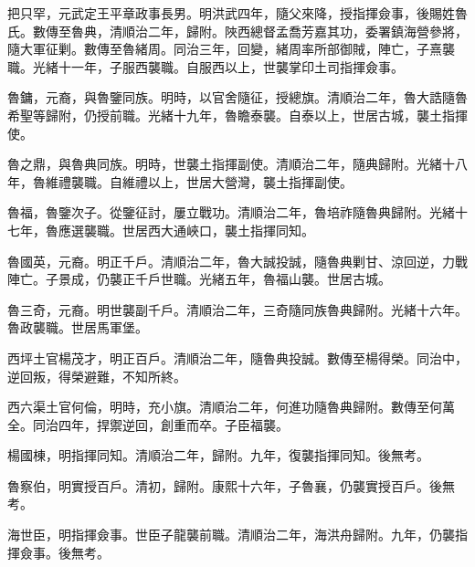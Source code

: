 \begin{pinyinscope}
把只罕，元武定王平章政事長男。明洪武四年，隨父來降，授指揮僉事，後賜姓魯氏。數傳至魯典，清順治二年，歸附。陜西總督孟喬芳嘉其功，委署鎮海營參將，隨大軍征剿。數傳至魯緒周。同治三年，回變，緒周率所部御賊，陣亡，子熹襲職。光緒十一年，子服西襲職。自服西以上，世襲掌印土司指揮僉事。

魯鏞，元裔，與魯鑒同族。明時，以官舍隨征，授總旗。清順治二年，魯大誥隨魯希聖等歸附，仍授前職。光緒十九年，魯瞻泰襲。自泰以上，世居古城，襲土指揮使。

魯之鼎，與魯典同族。明時，世襲土指揮副使。清順治二年，隨典歸附。光緒十八年，魯維禮襲職。自維禮以上，世居大營灣，襲土指揮副使。

魯福，魯鑒次子。從鑒征討，屢立戰功。清順治二年，魯培祚隨魯典歸附。光緒十七年，魯應選襲職。世居西大通峽口，襲土指揮同知。

魯國英，元裔。明正千戶。清順治二年，魯大誠投誠，隨魯典剿甘、涼回逆，力戰陣亡。子景成，仍襲正千戶世職。光緒五年，魯福山襲。世居古城。

魯三奇，元裔。明世襲副千戶。清順治二年，三奇隨同族魯典歸附。光緒十六年。魯政襲職。世居馬軍堡。

西坪土官楊茂才，明正百戶。清順治二年，隨魯典投誠。數傳至楊得榮。同治中，逆回叛，得榮避難，不知所終。

西六渠土官何倫，明時，充小旗。清順治二年，何進功隨魯典歸附。數傳至何萬全。同治四年，捍禦逆回，創重而卒。子臣福襲。

楊國棟，明指揮同知。清順治二年，歸附。九年，復襲指揮同知。後無考。

魯察伯，明實授百戶。清初，歸附。康熙十六年，子魯襄，仍襲實授百戶。後無考。

海世臣，明指揮僉事。世臣子龍襲前職。清順治二年，海洪舟歸附。九年，仍襲指揮僉事。後無考。


\end{pinyinscope}